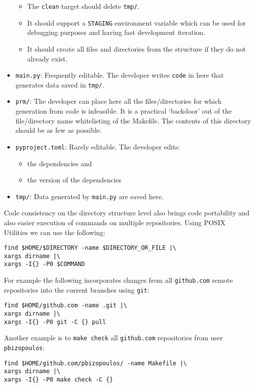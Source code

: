 \documentclass[journal]{IEEEtran}
\begin{document}
\begin{itemize}
\begin{itemize}
			\item The \texttt{clean} target should delete \texttt{tmp/}.
			\item It should support a \texttt{STAGING} environment variable which can be used for debugging purposes and having fast development iteration.
			\item It should create all files and directories from the structure if they do not already exist.
		\end{itemize}
	\item \texttt{main.py}: Frequently editable. The developer writes \texttt{code} in here that generates data saved in \texttt{tmp/}.
	\item \texttt{prm/}: The developer can place here all the files/directories for which generation from code is infeasible. It is a practical `backdoor' out of the file/directory name whitelisting of the Makefile. The contents of this directory should be as few as possible.
	\item \texttt{pyproject.toml}: Rarely editable. The developer edits:
		\begin{itemize}
			\item the dependencies and
			\item the version of the dependencies
		\end{itemize}
	\item \texttt{tmp/}: Data generated by \texttt{main.py} are saved here.
\end{itemize}

Code consistency on the directory structure level also brings code portability and also easier execution of commands on multiple repositories.
Using POSIX Utilities we can use the following:
\begin{verbatim}
find $HOME/$DIRECTORY -name $DIRECTORY_OR_FILE |\
xargs dirname |\
xargs -I{} -P0 $COMMAND
\end{verbatim}

For example the following incorporates changes from all \texttt{github.com} remote repositories into the current branches using \texttt{git}:
\begin{verbatim}
find $HOME/github.com -name .git |\
xargs dirname |\
xargs -I{} -P0 git -C {} pull
\end{verbatim}

Another example is to \texttt{make check} all \texttt{github.com} repositories from user \texttt{pbizopoulos}:
\begin{verbatim}
find $HOME/github.com/pbizopoulos/ -name Makefile |\
xargs dirname |\
xargs -I{} -P0 make check -C {}
\end{verbatim}
\end{document}
